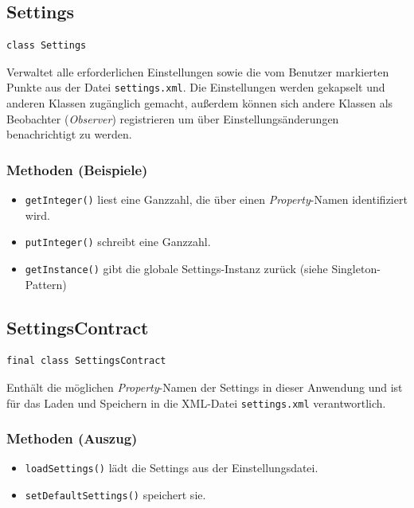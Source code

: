 \documentclass[10pt]{scrreprt}
\begin{document}
\subsection*{Settings}
\begin{lstlisting}
class Settings
\end{lstlisting}
Verwaltet alle erforderlichen Einstellungen sowie die vom Benutzer markierten Punkte aus der Datei \texttt{settings.xml}. Die Einstellungen werden gekapselt und anderen Klassen zugänglich gemacht, außerdem können sich andere Klassen als Beobachter (\textit{Observer}) registrieren um über Einstellungsänderungen benachrichtigt zu werden.\\
\subsubsection*{Methoden (Beispiele)}
\begin{itemize}
\item \texttt{getInteger()} liest eine Ganzzahl, die über einen \textit{Property}-Namen identifiziert wird.
\item \texttt{putInteger()} schreibt eine Ganzzahl.
\item \texttt{getInstance()} gibt die globale Settings-Instanz zurück (siehe Singleton-Pattern)
\end{itemize}

\vspace{5mm}
\subsection*{SettingsContract}
\begin{lstlisting}
final class SettingsContract
\end{lstlisting}
Enthält die möglichen \textit{Property}-Namen der Settings in dieser Anwendung und ist für das Laden und Speichern in die XML-Datei \texttt{settings.xml} verantwortlich.\\
\subsubsection*{Methoden (Auszug)}
\begin{itemize}
\item \texttt{loadSettings()} lädt die Settings aus der Einstellungsdatei.
\item \texttt{setDefaultSettings()} speichert sie.
\end{itemize}
\end{document}
